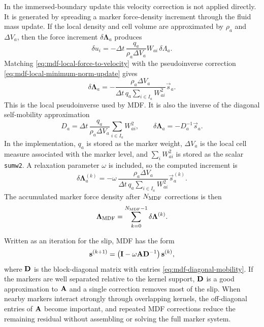 In the immersed-boundary update this velocity correction is not applied
directly. It is generated by spreading a marker force-density increment through
the fluid mass update. If the local density and cell volume are approximated by
\(\rho_a\) and \(\Delta V_a\), then the force increment \(\delta\bm\Lambda_a\)
produces
\begin{equation}
    \delta u_i
    = -\Delta t\,\frac{q_a}{\rho_a\Delta V_a}
    W_{ai}\,\delta\Lambda_a .
    \label{eq:mdf-local-force-to-velocity}
\end{equation}
Matching \eqref{eq:mdf-local-force-to-velocity} with the pseudoinverse
correction \eqref{eq:mdf-local-minimum-norm-update} gives
\begin{equation}
    \delta\bm\Lambda_a
    =
    -\frac{\rho_a\Delta V_a}
    {\Delta t\,q_a\sum_{i\in I_a}W_{ai}^2}
    \vec s_a .
    \label{eq:mdf-local-force-increment}
\end{equation}
This is the local pseudoinverse used by MDF. It is also the inverse of the
diagonal self-mobility approximation
\begin{equation}
    D_a
    =
    \Delta t\,\frac{q_a}{\rho_a\Delta V_a}
    \sum_{i\in I_a}W_{ai}^2,
    \qquad
    \delta\bm\Lambda_a = -D_a^{-1}\vec s_a .
    \label{eq:mdf-diagonal-mobility}
\end{equation}
In the implementation, \(q_a\) is stored as the marker weight, \(\Delta V_a\)
is the local cell measure associated with the marker level, and
\(\sum_i W_{ai}^2\) is stored as the scalar \texttt{sumw2}. A relaxation
parameter \(\omega\) is included, so the computed increment is
\begin{equation}
    \delta\bm\Lambda_a^{(k)}
    =
    -\omega\,
    \frac{\rho_a\Delta V_a}
    {\Delta t\,q_a\sum_{i\in I_a}W_{ai}^2}
    \vec s_a^{(k)} .
    \label{eq:mdf-relaxed-force-increment}
\end{equation}
The accumulated marker force density after \(N_{\rm MDF}\) corrections is then
\begin{equation}
    \bm\Lambda_{\rm MDF}
    =
    \sum_{k=0}^{N_{\rm MDF}-1}\delta\bm\Lambda^{(k)} .
    \label{eq:mdf-accumulated-force}
\end{equation}

Written as an iteration for the slip, MDF has the form
\begin{equation}
    \mathbf{s}^{(k+1)}
    =
    \left(\mathbf{I}-\omega\mathbf{A}\mathbf{D}^{-1}\right)\mathbf{s}^{(k)},
    \label{eq:mdf-richardson-slip}
\end{equation}
where \(\mathbf{D}\) is the block-diagonal matrix with entries
\eqref{eq:mdf-diagonal-mobility}. If the markers are well separated relative
to the kernel support, \(\mathbf{D}\) is a good approximation to \(\mathbf{A}\) and a
single correction removes most of the slip. When nearby markers interact
strongly through overlapping kernels, the off-diagonal entries of \(\mathbf{A}\)
become important, and repeated MDF corrections reduce the remaining residual
without assembling or solving the full marker system.

